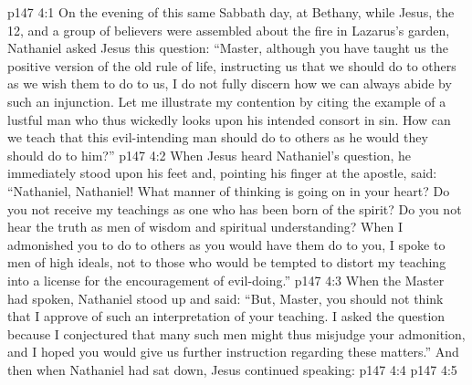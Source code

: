 \vs p147 4:1 On the evening of this same Sabbath day, at Bethany, while Jesus, the 12, and a group of believers were assembled about the fire in Lazarus’s garden, Nathaniel asked Jesus this question: “Master, although you have taught us the positive version of the old rule of life, instructing us that we should do to others as we wish them to do to us, I do not fully discern how we can always abide by such an injunction. Let me illustrate my contention by citing the example of a lustful man who thus wickedly looks upon his intended consort in sin. How can we teach that this evil\hyp{}intending man should do to others as he would they should do to him?”
\vs p147 4:2 When Jesus heard Nathaniel’s question, he immediately stood upon his feet and, pointing his finger at the apostle, said: “Nathaniel, Nathaniel! What manner of thinking is going on in your heart? Do you not receive my teachings as one who has been born of the spirit? Do you not hear the truth as men of wisdom and spiritual understanding? When I admonished you to do to others as you would have them do to you, I spoke to men of high ideals, not to those who would be tempted to distort my teaching into a license for the encouragement of evil\hyp{}doing.”
\vs p147 4:3 When the Master had spoken, Nathaniel stood up and said: “But, Master, you should not think that I approve of such an interpretation of your teaching. I asked the question because I conjectured that many such men might thus misjudge your admonition, and I hoped you would give us further instruction regarding these matters.” And then when Nathaniel had sat down, Jesus continued speaking: 
\vs p147 4:4 
\vs p147 4:5 \pc {}
